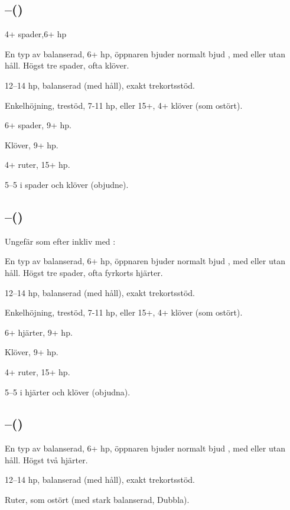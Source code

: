 \subsection{--()}


\bbe
\item[D] 4+ spader,6+ hp
\item[\spa{1}] En typ av balanserad, 6+ hp, öppnaren bjuder normalt bjud ,
  med eller utan håll. Högst tre spader, ofta klöver.
\item[\NT{1}] 12--14 hp, balanserad (med håll), exakt trekortsstöd.
\item[\kl{2}] Enkelhöjning, trestöd, 7-11 hp, eller 15+, 4+ klöver (som ostört).
\item[\ru{2}] 6+ spader, 9+ hp.
\item[\hj{2}] Klöver, 9+ hp.
\item[\spa{2}] 4+ ruter, 15+ hp.
\item[\NT{2}] 5--5 i spader och klöver (objudne).  
\ebe


\subsection{--()}

Ungefär som efter inkliv med :

\bbe
\item[D] En typ av balanserad, 6+ hp, öppnaren bjuder normalt bjud ,
  med eller utan håll. Högst tre spader, ofta fyrkorts hjärter.
\item[\NT{1}] 12--14 hp, balanserad (med håll), exakt trekortsstöd.
\item[\kl{2}] Enkelhöjning, trestöd, 7-11 hp, eller 15+, 4+ klöver (som ostört).
\item[\ru{2}] 6+ hjärter, 9+ hp.
\item[\hj{2}] Klöver, 9+ hp.
\item[\spa{2}] 4+ ruter, 15+ hp.  
\item[\NT{2}] 5--5 i hjärter och klöver (objudna).   
\ebe


\subsection{--()}

\bbe
\item[D] En typ av balanserad, 6+ hp, öppnaren bjuder normalt bjud ,
  med eller utan håll. Högst två hjärter.
\item[\NT{1}] 12--14 hp, balanserad (med håll), exakt trekortsstöd.
\item[\kl{2}] Ruter, som ostört (med stark balanserad, Dubbla).
\ebe

